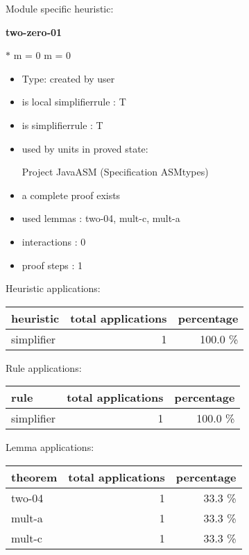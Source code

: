 \documentclass[a4paper]{article}
\begin{document}
Module specific heuristic:

\pagebreak

{\LARGE\bf two-zero-01}\label{lemma-two-zero-01}

\medskip

  $*$ m = 0 \Equiv m = 0

\begin{itemize}

\item Type: created by user

\item is local simplifierrule : T
\item is simplifierrule : T
\item used by units in proved state:

Project JavaASM (Specification ASMtypes)
\item       a complete proof exists
\item       used lemmas  : two-04, mult-c, mult-a
\item       interactions : 0
\item       proof steps  : 1
\end{itemize}

\medskip


Heuristic applications:

\begin{supertabular}{l|r|r}
heuristic	& total applications & percentage \\ \hline
simplifier & 1 & 100.0 \% \\

\end{supertabular}

Rule applications:

\begin{supertabular}{l|r|r}
rule	        & total applications & percentage \\ \hline
simplifier & 1 & 100.0 \% \\

\end{supertabular}

Lemma applications:

\begin{supertabular}{l|r|r}
theorem	        & total applications & percentage \\ \hline
two-04 & 1 & 33.3 \% \\
mult-a & 1 & 33.3 \% \\
mult-c & 1 & 33.3 \% \\

\end{supertabular}
\end{document}
